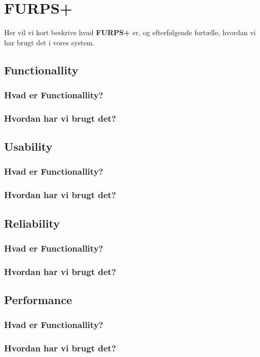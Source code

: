 \section{FURPS+}
Her vil vi kort beskrive hvad \textbf{FURPS+} er, og efterfølgende fortælle, hvordan vi har brugt det i vores system.
\subsection{Functionallity}
\subsubsection{Hvad er Functionallity?}
\subsubsection{Hvordan har vi brugt det?}
\subsection{Usability}
\subsubsection{Hvad er Functionallity?}
\subsubsection{Hvordan har vi brugt det?}
\subsection{Reliability}
\subsubsection{Hvad er Functionallity?}
\subsubsection{Hvordan har vi brugt det?}
\subsection{Performance}
\subsubsection{Hvad er Functionallity?}
\subsubsection{Hvordan har vi brugt det?}
